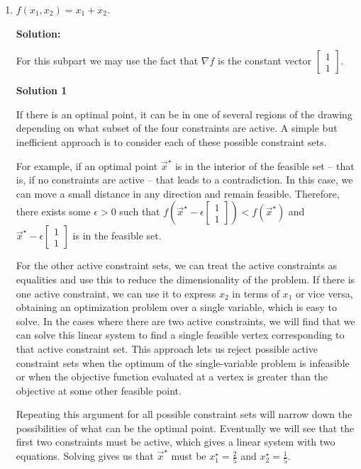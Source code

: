 \documentclass[10pt]{article}
\begin{document}
\begin{enumerate}[label=(\alph*), resume]
    \item $f(x_1, x_2) = x_1 + x_2$.

    \textbf{Solution:}

    For this subpart we may use the fact that $\nabla f$ is the constant vector $\begin{bmatrix} 1 \\ 1 \end{bmatrix}$.

    \textbf{Solution 1}

    If there is an optimal point, it can be in one of several regions of the drawing depending on what subset of the four constraints are active. A simple but inefficient approach is to consider each of these possible constraint sets.

    For example, if an optimal point $\vec{x}^\star$ is in the interior of the feasible set -- that is, if no constraints are active -- that leads to a contradiction. In this case, we can move a small distance in any direction and remain feasible. Therefore, there exists some $\epsilon > 0$ such that $f\!\left(\vec{x}^\star - \epsilon \begin{bmatrix} 1 \\ 1 \end{bmatrix}\right) < f(\vec{x}^\star)$ and $\vec{x}^\star - \epsilon \begin{bmatrix} 1 \\ 1 \end{bmatrix}$ is in the feasible set.

    For the other active constraint sets, we can treat the active constraints as equalities and use this to reduce the dimensionality of the problem. If there is one active constraint, we can use it to express $x_2$ in terms of $x_1$ or vice versa, obtaining an optimization problem over a single variable, which is easy to solve. In the cases where there are two active constraints, we will find that we can solve this linear system to find a single feasible vertex corresponding to that active constraint set. This approach lets us reject possible active constraint sets when the optimum of the single-variable problem is infeasible or when the objective function evaluated at a vertex is greater than the objective at some other feasible point.

    Repeating this argument for all possible constraint sets will narrow down the possibilities of what can be the optimal point. Eventually we will see that the first two constraints must be active, which gives a linear system with two equations. Solving gives us that $\vec{x}^\star$ must be $x_1^\star = \tfrac{2}{5}$ and $x_2^\star = \tfrac{1}{5}$.


\end{enumerate}
\end{document}
